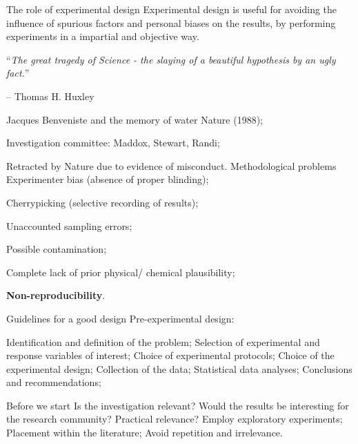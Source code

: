 \begin{frame}{The role of experimental design}
Experimental design is useful for avoiding the influence of spurious factors and personal biases on the results, by performing experiments in a impartial and objective way.

\vspace{2ex}

``\textit{The great tragedy of Science - the slaying of a
		beautiful hypothesis by an ugly fact.}''
		
		-- Thomas H. Huxley
\end{frame}

\begin{frame}{Jacques Benveniste and the memory of water}
	\bitems Nature (1988);
		\item Investigation committee: Maddox, Stewart, Randi;
		\item Retracted by Nature due to evidence of misconduct.
	\eitem
	Methodological problems
	\bitems Experimenter bias (absence of proper blinding);
		\item Cherrypicking (selective recording of results);
		\item Unaccounted sampling errors;
		\item Possible contamination;
		\item Complete lack of prior physical/ chemical plausibility;
		\item \textbf{Non-reproducibility}.
	\eitem
\end{frame}

\begin{frame}{Guidelines for a good design}
\bitems Pre-experimental design:

	\bitems Identification and definition of the problem;
		\spitem Selection of experimental and response variables of interest;
		\spitem Choice of experimental protocols;
	\eitem
	\spitem Choice of the experimental design;
	\spitem Collection of the data;
	\spitem Statistical data analyses;
	\spitem Conclusions and recommendations;
\eitem
\end{frame}


\begin{frame}{Before we start}
\bitems Is the investigation relevant?
	\spitem Would the results be interesting for the research community?
	\spitem Practical relevance?
	\bitems Employ exploratory experiments;\eitem
	\spitem Placement within the literature;
	\bitems Avoid repetition and irrelevance.\eitem
\eitem
\end{frame}


